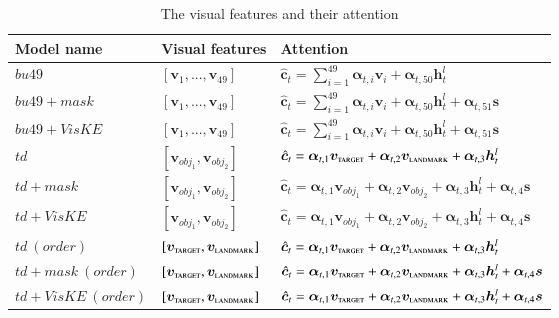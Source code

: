 \begin{table}[htb]
	\centering
	\scriptsize
	\begin{tabular}{|l|l|l|}
		\hline
		Model name   & Visual features & Attention \\
		\hline
		$bu49$       & $[\bm{v}_{1}, ..., \bm{v}_{49}]$ & $\hat{\bm{c}}_t = \sum_{i=1}^{49} \bm{\alpha}_{t,i} \bm{v}_{i} + \bm{\alpha}_{t,50} {\bm{h}_t^l}$
		\\
		$bu49+mask$  & $[\bm{v}_{1}, ..., \bm{v}_{49}]$ & $\hat{\bm{c}}_t = \sum_{i=1}^{49} \bm{\alpha}_{t,i} \bm{v}_{i} + \bm{\alpha}_{t,50} {\bm{h}_t^l} + \bm{\alpha}_{t,51} \bm{s}$ \\
		$bu49+VisKE$ & $[\bm{v}_{1}, ..., \bm{v}_{49}]$ & $\hat{\bm{c}}_t = \sum_{i=1}^{49} \bm{\alpha}_{t,i} \bm{v}_{i} + \bm{\alpha}_{t,50} {\bm{h}_t^l} + \bm{\alpha}_{t,51} \bm{s}$ \\
		\hline
		$td$         & $[\bm{v}_{obj_1}, \bm{v}_{obj_2}]$ & $\hat{\bm{c}}_t = \bm{\alpha}_{t,1} \bm{v}_{\textsc{target}} + \bm{\alpha}_{t,2} \bm{v}_{\textsc{landmark}} + \bm{\alpha}_{t,3} {\bm{h}_t^l}$ \\
		$td+mask$    & $[\bm{v}_{obj_1}, \bm{v}_{obj_2}]$ & $\hat{\bm{c}}_t = \bm{\alpha}_{t,1} \bm{v}_{obj_1} + \bm{\alpha}_{t,2} \bm{v}_{obj_2} + \bm{\alpha}_{t,3} {\bm{h}_t^l} + \bm{\alpha}_{t,4} \bm{s}$ \\
		$td+VisKE$   & $[\bm{v}_{obj_1}, \bm{v}_{obj_2}]$ & $\hat{\bm{c}}_t = \bm{\alpha}_{t,1} \bm{v}_{obj_1} + \bm{\alpha}_{t,2} \bm{v}_{obj_2} + \bm{\alpha}_{t,3} {\bm{h}_t^l} + \bm{\alpha}_{t,4} \bm{s}$ \\
		\hline
		$td~(order)$ & $[\bm{v}_{\textsc{target}}, \bm{v}_{\textsc{landmark}}]$ & $\hat{\bm{c}}_t = \bm{\alpha}_{t,1} \bm{v}_{\textsc{target}} + \bm{\alpha}_{t,2} \bm{v}_{\textsc{landmark}} + \bm{\alpha}_{t,3} {\bm{h}_t^l}$ \\
		$td+mask~(order)$ & $[\bm{v}_{\textsc{target}}, \bm{v}_{\textsc{landmark}}]$ & $\hat{\bm{c}}_t = \bm{\alpha}_{t,1} \bm{v}_{\textsc{target}} + \bm{\alpha}_{t,2} \bm{v}_{\textsc{landmark}} + \bm{\alpha}_{t,3} {\bm{h}_t^l} + \bm{\alpha}_{t,4} \bm{s}$ \\
		$td+VisKE~(order)$ & $[\bm{v}_{\textsc{target}}, \bm{v}_{\textsc{landmark}}]$ & $\hat{\bm{c}}_t = \bm{\alpha}_{t,1} \bm{v}_{\textsc{target}} + \bm{\alpha}_{t,2} \bm{v}_{\textsc{landmark}} + \bm{\alpha}_{t,3} {\bm{h}_t^l} + \bm{\alpha}_{t,4} \bm{s}$ \\
		\hline
	\end{tabular}
	\vspace{0.5em}
	\caption{The visual features and their attention}
	\label{inlg2019:tab:models2}
\end{table}

